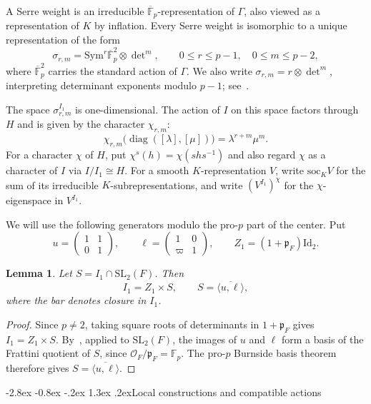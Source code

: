 \documentclass[10pt]{article}
\makeatletter
\renewcommand\section{\@startsection{section}{1}{\z@}%
  {-2.8ex \@plus -0.8ex \@minus -.2ex}%
  {1.3ex \@plus .2ex}{\normalfont\Large\bfseries}}
\theoremstyle{plain}
\newtheorem{lemma}[theorem]{Lemma}
\theoremstyle{definition}
\theoremstyle{remark}
\newcommand{\Fp}{\mathbb{F}_p}
\newcommand{\Fpbar}{\overline{\mathbb{F}}_p}
\newcommand{\Sym}{\mathrm{Sym}}
\newcommand{\soc}{\mathrm{soc}}
\newcommand{\Id}{\mathrm{Id}}
\makeatother
\begin{document}
A Serre weight is an irreducible $\Fpbar$-representation of $\Gamma$, also viewed as a representation of $K$ by inflation. Every Serre weight is isomorphic to a unique representation of the form
\[
\sigma_{r,m}=\Sym^r\Fpbar^2\otimes\det\nolimits^{m},
\qquad 0\leq r\leq p-1,\quad 0\leq m\leq p-2,
\]
where $\Fpbar^2$ carries the standard action of $\Gamma$. We also write $\sigma_{r,m}=r\otimes\det^m$, interpreting determinant exponents modulo $p-1$; see~\cite[\S1]{BL94}.

The space $\sigma_{r,m}^{I_1}$ is one-dimensional. The action of $I$ on this space factors through $H$ and is given by the character $\chi_{r,m}$:
\[
\chi_{r,m}\bigl(\operatorname{diag}([\lambda],[\mu])\bigr)
=\lambda^{r+m}\mu^m.
\]
For a character $\chi$ of $H$, put $\chi^s(h)=\chi(shs^{-1})$ and also regard $\chi$ as a character of $I$ via $I/I_1\cong H$. For a smooth $K$-representation $V$, write $\soc_K V$ for the sum of its irreducible $K$-subrepresentations, and write $(V^{I_1})^\chi$ for the $\chi$-eigenspace in $V^{I_1}$.

We will use the following generators modulo the pro-$p$ part of the center. Put
\[
u=\begin{pmatrix}1&1\\0&1\end{pmatrix},\qquad
\ell=\begin{pmatrix}1&0\\\varpi&1\end{pmatrix},\qquad
Z_1=(1+\mathfrak p_F)\Id_2.
\]

\begin{lemma}\label{lem:I1-generators}
Let $S=I_1\cap\mathrm{SL}_2(F)$. Then
\[
I_1=Z_1\times S,\qquad S=\overline{\langle u,\ell\rangle},
\]
where the bar denotes closure in $I_1$.
\end{lemma}

\begin{proof}
Since $p\ne2$, taking square roots of determinants in $1+\mathfrak p_F$ gives $I_1=Z_1\times S$. By~\cite[Corollary~5.3]{Koz18}, applied to $\mathrm{SL}_2(F)$, the images of $u$ and $\ell$ form a basis of the Frattini quotient of $S$, since $\mathcal O_F/\mathfrak p_F=\Fp$. The pro-$p$ Burnside basis theorem therefore gives $S=\overline{\langle u,\ell\rangle}$.
\end{proof}


\section{Local constructions and compatible actions}\label{sec:local-constructions}
\end{document}
